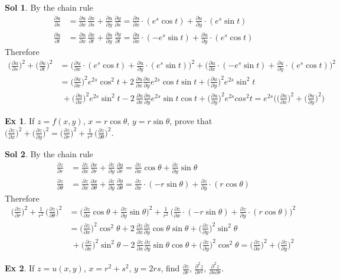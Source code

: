 \documentclass[12pt]{extarticle}
\newcommand{\ds}{\displaystyle}
\theoremstyle{definition}
\newtheorem*{ex}{Ex}
\newtheorem*{sol}{Sol}
\newcommand{\pdiff}[2]{\frac{\partial #1}{\partial #2}}
\newcommand{\pdifft}[2]{\frac{\partial^2 #1}{\partial #2^2}}
\begin{document}
\begin{sol} By the chain rule
  \begin{align*}
    \pdiff{u}{s} &= \pdiff{u}{x}\,\pdiff{x}{s} + \pdiff{u}{y}\,\pdiff{y}{s} = \pdiff{u}{x}\cdot(e^s\cos t) + \pdiff{u}{y}\cdot(e^s\sin t)\\
    \pdiff{u}{t} &= \pdiff{u}{x}\,\pdiff{x}{t} + \pdiff{u}{y}\,\pdiff{y}{t} = \pdiff{u}{x}\cdot(-e^s\sin t) + \pdiff{u}{y}\cdot(e^s\cos t)
  \end{align*}
  Therefore
  \begin{align*}
    \bigg(\pdiff{u}{s}\bigg)^2 + \bigg(\pdiff{u}{t}\bigg)^2 &= \bigg(\pdiff{u}{x}\cdot(e^s\cos t) + \pdiff{u}{y}\cdot(e^s\sin t)\bigg)^2 + \bigg(\pdiff{u}{x}\cdot(-e^s\sin t) + \pdiff{u}{y}\cdot(e^s\cos t)\bigg)^2 \\
    &= \bigg(\pdiff{u}{x}\bigg)^2 e^{2s} \cos^2 t + 2\,\pdiff{u}{x}\pdiff{u}{y}e^{2s}\cos t\sin t + \bigg(\pdiff{u}{y}\bigg)^2 e^{2s}\sin^2 t \\ &\; + \bigg(\pdiff{u}{x}\bigg)^2 e^{2s}\sin^2 t - 2\,\pdiff{u}{x}\pdiff{u}{y} e^{2s} \sin t\cos t + \bigg(\pdiff{u}{y}\bigg)^2 e^{2s} cos^2 t = e^{2s}\bigg(\bigg(\pdiff{u}{x}\bigg)^2 + \bigg(\pdiff{u}{y}\bigg)^2\bigg) 
  \end{align*}
\end{sol}

\begin{ex}
  If $\ds z = f(x, y)$, $\ds x = r\cos\theta$, $\ds y = r\sin\theta$, prove that $\ds\bigg(\pdiff{z}{x}\bigg)^2 + \bigg(\pdiff{z}{y}\bigg)^2 = \bigg(\pdiff{z}{r}\bigg)^2 + \frac{1}{r^2}\,\bigg(\pdiff{z}{\theta}\bigg)^2$.   
\end{ex}

\begin{sol} By the chain rule
  \begin{align*}
    \pdiff{z}{r} &= \pdiff{z}{x}\,\pdiff{x}{r} + \pdiff{z}{y}\,\pdiff{y}{r} = \pdiff{z}{x}\cos\theta + \pdiff{z}{y}\sin\theta \\
    \pdiff{z}{\theta} &= \pdiff{z}{x}\,\pdiff{x}{\theta} + \pdiff{z}{y}\,\pdiff{y}{\theta} = \pdiff{z}{x}\cdot(-r\sin\theta) + \pdiff{z}{y}\cdot(r\cos\theta)
  \end{align*}
  Therefore
  \begin{align*}
    \bigg(\pdiff{z}{r}\bigg)^2 + \frac{1}{r^2}\,\bigg(\pdiff{z}{\theta}\bigg)^2 &= \bigg(\pdiff{z}{x}\cos\theta + \pdiff{z}{y}\sin\theta\bigg)^2 + \frac{1}{r^2}\,\bigg(\pdiff{z}{x}\cdot(-r\sin\theta) + \pdiff{z}{y}\cdot(r\cos\theta)\bigg)^2 \\
    &= \bigg(\pdiff{z}{x}\bigg)^2\cos^2\theta + 2\,\pdiff{z}{x}\pdiff{z}{y}\cos\theta\sin\theta + \bigg(\pdiff{z}{y}\bigg)^2\sin^2\theta \\ &\; + \bigg(\pdiff{z}{x}\bigg)^2\sin^2\theta - 2\,\pdiff{z}{x}\pdiff{z}{y}\sin\theta\cos\theta + \bigg(\pdiff{z}{y}\bigg)^2\cos^2\theta = \bigg(\pdiff{z}{x}\bigg)^2 + \bigg(\pdiff{z}{y}\bigg)^2 
  \end{align*}
\end{sol}
\begin{ex}
  If $\ds z = u(x, y)$, $\ds x = r^2 + s^2$, $\ds y = 2rs$, find $\ds\pdiff{z}{r}$, $\ds\pdifft{z}{r}$, $\ds\frac{\partial^2 z}{\partial s\partial r}$. 
\end{ex}
\end{document}
